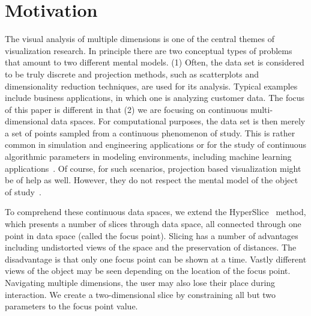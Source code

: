 \section{Motivation}
\label{sec:motivation}


The visual analysis of multiple dimensions is one of the central themes of
visualization research. In principle there are two conceptual types of problems
that amount to two different mental models. (1) Often, the data set is considered to be truly discrete 
and projection methods, such as 
scatterplots and dimensionality reduction techniques, are used for its analysis.
Typical examples include business applications, in which one is analyzing
customer data.
The focus of
this paper is different in that (2) we are focusing on continuous multi-dimensional data spaces. For computational purposes, the data set is then merely a
set of points sampled from a continuous phenomenon of study. This is
rather common in simulation and engineering applications or for the study of
continuous algorithmic parameters in modeling environments, including machine
learning applications~\cite{Sedlmair:2014}. Of course, for such scenarios, projection based
visualization might be of help as well. However, they do not respect the mental
model of the object of study~\cite{Tory:2004}.

To comprehend these continuous data spaces, we extend the
HyperSlice~\cite{Wijk:1993} method, which presents a number of slices through
data space, all connected through one point in data space (called the focus
point). Slicing has a number of advantages including undistorted views of the
space and the preservation of distances. The disadvantage is that only one
focus point can be shown at a time. Vastly different views of the object may be
seen depending on the location of the focus point. Navigating multiple
dimensions, the user may also lose their place during interaction.  We create a
two-dimensional slice by constraining all but two parameters to the focus point
value.

